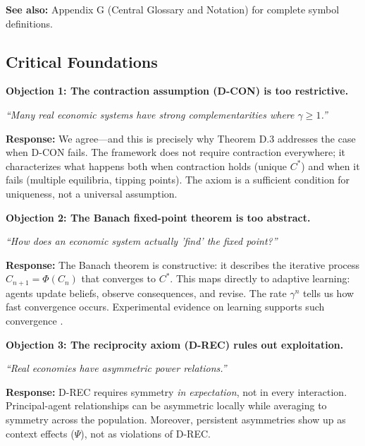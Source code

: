 \textbf{See also:} Appendix G (Central Glossary and Notation) for complete symbol definitions.


\subsection{Critical Foundations}
\label{sec:D-foundations}

\begin{tcolorbox}[colback=red!5!white, colframe=red!75!black,
    title=\textbf{Critical Foundations: Objections and Responses}]

\textbf{Objection 1: The contraction assumption (D-CON) is too restrictive.}

\textit{``Many real economic systems have strong complementarities where $\gamma \geq 1$.''}

\textbf{Response:} We agree---and this is precisely why Theorem D.3 addresses the
case when D-CON fails. The framework does not require contraction everywhere;
it characterizes what happens both when contraction holds (unique $C^*$) and
when it fails (multiple equilibria, tipping points). The axiom is a sufficient
condition for uniqueness, not a universal assumption.

\medskip

\textbf{Objection 2: The Banach fixed-point theorem is too abstract.}

\textit{``How does an economic system actually 'find' the fixed point?''}

\textbf{Response:} The Banach theorem is constructive: it describes the iterative
process $C_{n+1} = \Phi(C_n)$ that converges to $C^*$. This maps directly to
adaptive learning: agents update beliefs, observe consequences, and revise.
The rate $\gamma^n$ tells us how fast convergence occurs. Experimental evidence
on learning supports such convergence \citep{camerer2003}.

\medskip

\textbf{Objection 3: The reciprocity axiom (D-REC) rules out exploitation.}

\textit{``Real economies have asymmetric power relations.''}

\textbf{Response:} D-REC requires symmetry \emph{in expectation}, not in every
interaction. Principal-agent relationships can be asymmetric locally while
averaging to symmetry across the population. Moreover, persistent asymmetries
show up as context effects ($\Psi$), not as violations of D-REC.


\end{tcolorbox}
